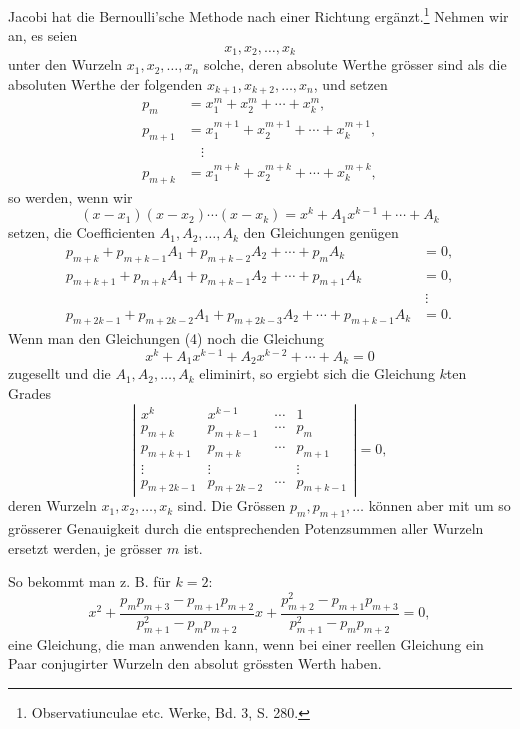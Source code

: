 \documentclass[11pt]{article}
\begin{document}
Jacobi hat die Bernoulli'sche Methode nach einer Richtung ergänzt.\footnote{Observatiunculae etc. Werke, Bd. 3, S. 280.} Nehmen wir an, es seien
\[
        x_1,x_2,\ldots,x_k
\]
unter den Wurzeln $x_1,x_2,\ldots,x_n$ solche, deren absolute Werthe grösser sind als die absoluten Werthe der folgenden $x_{k+1},x_{k+2},\ldots,x_n$, und setzen
\begin{equation}
\begin{aligned}
        p_m     &=x_1^m+x_2^m+\cdots+x_k^m,\\
        p_{m+1} &=x_1^{m+1}+x_2^{m+1}+\cdots+x_k^{m+1},\\
        &\quad\vdots\\
        p_{m+k} &=x_1^{m+k}+x_2^{m+k}+\cdots+x_k^{m+k},
\end{aligned}
\tag{2}
\end{equation}
so werden, wenn wir
\begin{equation}
        (x-x_1)(x-x_2)\cdots(x-x_k)
        =x^k+A_1x^{k-1}+\cdots+A_k
\tag{3}
\end{equation}
setzen, die Coefficienten $A_1,A_2,\ldots,A_k$ den Gleichungen genügen
\begin{equation}
\begin{aligned}
p_{m+k}+p_{m+k-1}A_1+p_{m+k-2}A_2+\cdots+p_mA_k&=0,\\
p_{m+k+1}+p_{m+k}A_1+p_{m+k-1}A_2+\cdots+p_{m+1}A_k&=0,\\
&\ \vdots\\
p_{m+2k-1}+p_{m+2k-2}A_1+p_{m+2k-3}A_2+\cdots+p_{m+k-1}A_k&=0.
\end{aligned}
\tag{4}
\end{equation}
Wenn man den Gleichungen (4) noch die Gleichung
\[
        x^k+A_1x^{k-1}+A_2x^{k-2}+\cdots+A_k=0
\]
zugesellt und die $A_1,A_2,\ldots,A_k$ eliminirt, so ergiebt sich die Gleichung $k$ten Grades
\[
\left|
\begin{array}{cccc}
x^k&x^{k-1}&\cdots&1\\
p_{m+k}&p_{m+k-1}&\cdots&p_m\\
p_{m+k+1}&p_{m+k}&\cdots&p_{m+1}\\
\vdots&\vdots&&\vdots\\
p_{m+2k-1}&p_{m+2k-2}&\cdots&p_{m+k-1}
\end{array}\right|=0,
\]
deren Wurzeln $x_1,x_2,\ldots,x_k$ sind. Die Grössen $p_m,p_{m+1},\ldots$ können aber mit um so grösserer Genauigkeit durch die entsprechenden Potenzsummen aller Wurzeln ersetzt werden, je grösser $m$ ist.

So bekommt man z. B. für $k=2$:
\[
x^2+\frac{p_mp_{m+3}-p_{m+1}p_{m+2}}
          {p_{m+1}^2-p_mp_{m+2}}x
 +\frac{p_{m+2}^2-p_{m+1}p_{m+3}}
          {p_{m+1}^2-p_mp_{m+2}}=0,
\]
eine Gleichung, die man anwenden kann, wenn bei einer reellen Gleichung ein Paar conjugirter Wurzeln den absolut grössten Werth haben.
\end{document}
